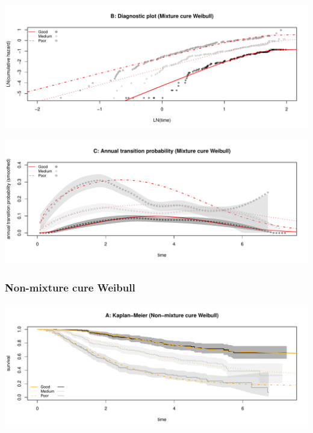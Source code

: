 \documentclass[
]{article}
\begin{document}
\begin{flushleft}\includegraphics[height=0.25\textheight]{BC_OS_output/Images/Figure_cure_models-2} \end{flushleft}

\begin{flushleft}\includegraphics[height=0.25\textheight]{BC_OS_output/Images/Figure_cure_models-3} \end{flushleft}

\clearpage

\subsubsection{Non-mixture cure Weibull}\label{non-mixture-cure-weibull}

\begin{flushleft}\includegraphics[height=0.25\textheight]{BC_OS_output/Images/Figure_cure_models-4} \end{flushleft}
\end{document}
